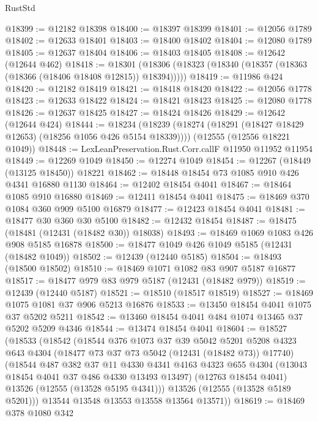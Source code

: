 \begin{lexlean}{RustStd}
\begin{coremodule}
@18399 := @12182 @18398
@18400 := @18397 @18399
@18401 := @12056 @1789
@18402 := @12633 @18401
@18403 := @18400 @18402
@18404 := @12080 @1789
@18405 := @12637 @18404
@18406 := @18403 @18405
@18408 := @12642 (@12644 @462)
@18418 := @18301 (@18306 (@18323 (@18340 (@18357 (@18363 (@18366 (@18406 @18408 @12815)) @18394)))))
@18419 := @11986 @424
@18420 := @12182 @18419
@18421 := @18418 @18420
@18422 := @12056 @1778
@18423 := @12633 @18422
@18424 := @18421 @18423
@18425 := @12080 @1778
@18426 := @12637 @18425
@18427 := @18424 @18426
@18429 := @12642 (@12644 @424)
@18444 := @18234
    (@18239 (@18274 (@18291 (@18427 @18429 @12653) (@18256 @1056 @426 @5154 @18339))))
    (@12555 (@12556 @18221 @1049))
@18448 := LexLeanPreservation.Rust.Corr.callF @11950 @11952 @11954
@18449 := @12269 @1049
@18450 := @12274 @1049
@18454 := @12267 (@18449 (@13125 @18450)) @18221
@18462 := @18448 @18454 @73 @1085 @910 @426 @4341 @16880 @1130
@18464 := @12402 @18454 @4041
@18467 := @18464 @1085 @910 @16880
@18469 := @12411 @18454 @4041
@18475 := @18469 @370 @1084 @360 @909 @5100 @16879
@18477 := @12423 @18454 @4041
@18481 := @18477 @30 @360 @30 @5100
@18482 := @12432 @18454
@18487 := @18475 (@18481 (@12431 (@18482 @30)) @18038)
@18493 := @18469 @1069 @1083 @426 @908 @5185 @16878
@18500 := @18477 @1049 @426 @1049 @5185 (@12431 (@18482 @1049))
@18502 := @12439 (@12440 @5185)
@18504 := @18493 (@18500 @18502)
@18510 := @18469 @1071 @1082 @83 @907 @5187 @16877
@18517 := @18477 @979 @83 @979 @5187 (@12431 (@18482 @979))
@18519 := @12439 (@12440 @5187)
@18521 := @18510 (@18517 @18519)
@18527 := @18469 @1075 @1081 @37 @906 @5213 @16876
@18533 := @13450 @18454 @4041 @1075 @37 @5202 @5211
@18542 := @13460 @18454 @4041 @484 @1074 @13465 @37 @5202 @5209 @4346
@18544 := @13474 @18454 @4041
@18604 := @18527
    (@18533
      (@18542
        (@18544
          @376
          @1073
          @37
          @39
          @5042
          @5201
          @5208
          @4323
          @643
          @4304
          (@18477 @73 @37 @73 @5042 (@12431 (@18482 @73)) @17740)
          (@18544
            @487
            @382
            @37
            @11
            @4330
            @4341
            @4163
            @4323
            @655
            @4304
            (@13043 @18454 @4041 @37 @486 @4330 @13493 @13497)
            (@12763 @18454 @4041)
            @13526
            (@12555 (@13528 @5195 @4341)))
          @13526
          (@12555 (@13528 @5189 @5201)))
        @13544
        @13548
        @13553
        @13558
        @13564
        @13571))
@18619 := @18469
    @378
    @1080
    @342

\end{coremodule}
\end{lexlean}
